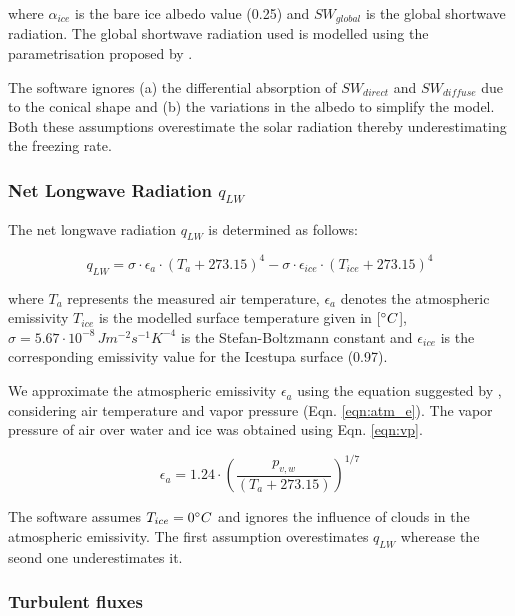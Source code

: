 \documentclass[utf8]{frontiersSCNS}
\begin{document}
where $\alpha_{ice}$ is the bare ice albedo value (0.25) and $SW_{global}$ is the global shortwave radiation.
The global shortwave radiation used is modelled using the parametrisation proposed by \cite{Woolf_1968}.

The software ignores (a) the differential absorption of $SW_{direct}$ and $SW_{diffuse}$ due to the conical
shape and (b) the variations in the albedo to simplify the model. Both these assumptions overestimate the solar
radiation thereby underestimating the freezing rate.

\subsubsection{Net Longwave Radiation \texorpdfstring{$q_{LW}$}{Lg}} \label{sec:LW}

The net longwave radiation $q_{LW}$ is determined as follows:

\begin{equation}
	q_{LW}= \sigma \cdot \epsilon_a \cdot {(T_a+ 273.15)}^4 -\sigma \cdot \epsilon_{ice} \cdot {(T_{ice}+ 273.15)}^4
	\label{eqn:LW}
\end{equation}

where $T_a$ represents the measured air temperature, $\epsilon_a$ denotes the atmospheric emissivity $T_{ice}$
is the modelled surface temperature given in [$\degree C$], $\sigma=5.67\cdot10^{-8}\,Jm^{-2}s^{-1}K^{-4}$ is
the Stefan-Boltzmann constant and $\epsilon_{ice}$ is the corresponding emissivity value for the Icestupa
surface (0.97).

We approximate the atmospheric emissivity $\epsilon_a$ using the equation suggested by \cite{Brutsaert_1975},
considering air temperature and vapor pressure (Eqn. \ref{eqn:atm_e}). The vapor pressure of air over water and
ice was obtained using Eqn. \ref{eqn:vp}.  

\begin{equation}
	\epsilon_a=1.24 \cdot (\frac{p_{v,w}}{(T_a+273.15)})^{1/7} \label{eqn:atm_e}
\end{equation}

The software assumes $T_{ice} = 0 \degree C$ and ignores the influence of clouds in the atmospheric emissivity.
The first assumption overestimates $q_{LW}$ wherease the seond one underestimates it.  

\subsubsection{Turbulent fluxes} \label{sec:Qs}
\end{document}

